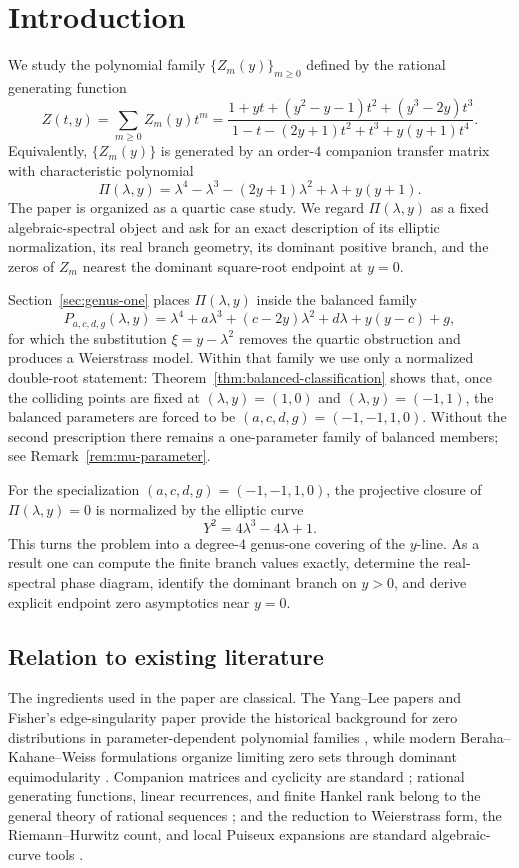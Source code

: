 \section{Introduction}

We study the polynomial family $\{Z_m(y)\}_{m\ge 0}$ defined by the rational generating function
\[
Z(t,y)=\sum_{m\ge 0} Z_m(y)t^m
=
\frac{1+yt+(y^2-y-1)t^2+(y^3-2y)t^3}
{1-t-(2y+1)t^2+t^3+y(y+1)t^4}.
\]
Equivalently, $\{Z_m(y)\}$ is generated by an order-$4$ companion transfer matrix with characteristic polynomial
\[
\Pi(\lambda,y)=\lambda^4-\lambda^3-(2y+1)\lambda^2+\lambda+y(y+1).
\]
The paper is organized as a quartic case study.
We regard \(\Pi(\lambda,y)\) as a fixed algebraic-spectral object and ask for an exact description of its elliptic normalization, its real branch geometry, its dominant positive branch, and the zeros of \(Z_m\) nearest the dominant square-root endpoint at \(y=0\).

Section~\ref{sec:genus-one} places \(\Pi(\lambda,y)\) inside the balanced family
\[
P_{a,c,d,g}(\lambda,y)=\lambda^4+a\lambda^3+(c-2y)\lambda^2+d\lambda+y(y-c)+g,
\]
for which the substitution \(\xi=y-\lambda^2\) removes the quartic obstruction and produces a Weierstrass model.
Within that family we use only a normalized double-root statement: Theorem~\ref{thm:balanced-classification} shows that, once the colliding points are fixed at $(\lambda,y)=(1,0)$ and $(\lambda,y)=(-1,1)$, the balanced parameters are forced to be \((a,c,d,g)=(-1,-1,1,0)\).
Without the second prescription there remains a one-parameter family of balanced members; see Remark~\ref{rem:mu-parameter}.

For the specialization \((a,c,d,g)=(-1,-1,1,0)\), the projective closure of \(\Pi(\lambda,y)=0\) is normalized by the elliptic curve
\[
Y^2=4\lambda^3-4\lambda+1.
\]
This turns the problem into a degree-$4$ genus-one covering of the \(y\)-line.
As a result one can compute the finite branch values exactly, determine the real-spectral phase diagram, identify the dominant branch on \(y>0\), and derive explicit endpoint zero asymptotics near \(y=0\).

\subsection{Relation to existing literature}

The ingredients used in the paper are classical.
The Yang--Lee papers and Fisher's edge-singularity paper provide the historical background for zero distributions in parameter-dependent polynomial families \cite{YangLee1952I,LeeYang1952II,Fisher1978}, while modern Beraha--Kahane--Weiss formulations organize limiting zero sets through dominant equimodularity \cite{BerahaKahaneWeiss1975,BerahaKahaneWeiss1978,Sokal2004,BrownOtto2025}.
Companion matrices and cyclicity are standard \cite{HornJohnson2012}; rational generating functions, linear recurrences, and finite Hankel rank belong to the general theory of rational sequences \cite{FlajoletSedgewick2009,Stanley2012,Partington1989}; and the reduction to Weierstrass form, the Riemann--Hurwitz count, and local Puiseux expansions are standard algebraic-curve tools \cite{Walker1950,Silverman2009,Miranda1995,BrieskornKnorrer1986}.

